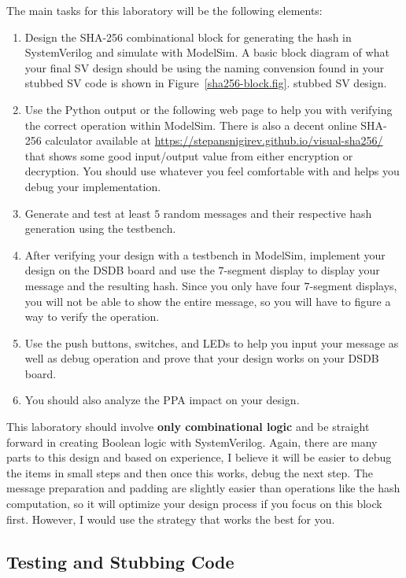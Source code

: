 \documentclass{article}
\begin{document}
The main tasks for this laboratory
will be the following elements:
\begin{enumerate}
  \item Design the SHA-256 combinational block for generating the hash
    in SystemVerilog and simulate with ModelSim.  A basic block
    diagram of what your final SV design should be using the naming convension
    found in your stubbed SV code is shown in
    Figure~\ref{sha256-block.fig}.  
    stubbed SV design.
  \item Use the Python output or the following web page to help you with verifying the
    correct operation within ModelSim.
    There is also a decent online
    SHA-256 calculator available at \url{https://stepansnigirev.github.io/visual-sha256/} that
    shows some good input/output value from either encryption or
    decryption.  You should use whatever you feel comfortable with and
    helps you debug your implementation.
  \item Generate and test at least $5$ random messages and their respective hash generation
    using the testbench.
  \item After verifying your design with a testbench in ModelSim,
    implement your design on the DSDB board and use the    
    $7$-segment display to display your message and the resulting hash.
    Since you only have four $7$-segment displays, you will not be
    able to show the entire message, so you will
    have to figure a way to verify the operation.
  \item Use the push buttons, switches, and LEDs to help you input
    your message as well as debug operation and prove that your
    design works on your DSDB board.
    \item You should also analyze the PPA impact on your design. 
\end{enumerate}
This laboratory should involve \textbf{only combinational logic} and be
straight forward in creating Boolean logic with SystemVerilog.
Again, there are many parts to this design and based on experience, I
believe it will be easier to debug the items in small steps and then
once this works, debug the next step.  The message preparation and
padding are slightly easier than operations like the hash computation,
so it will optimize your design process if you focus on this block
first.  However, I would use the strategy that works the best for you.

\subsection{Testing and Stubbing Code}
\end{document}
